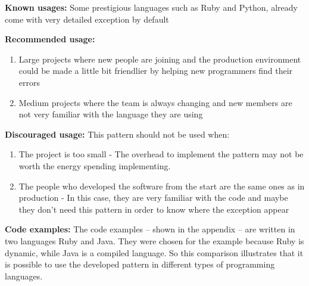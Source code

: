 \documentclass[12pt]{article}
\begin{document}
\begin{flushleft}
\textbf{Known usages:}
Some prestigious languages such as Ruby and Python, already come with very detailed exception by default\newline

\textbf{Recommended usage:}

\begin{enumerate}
\item Large projects where new people are joining and the production environment could be made a little bit friendlier by helping new programmers find their errors
\item Medium projects where the team is always changing and new members are not very familiar with the language they are using
\end{enumerate} 

\textbf{Discouraged usage:}
This pattern should not be used when:
\begin{enumerate}
\item The project is too small - The overhead to implement the pattern may not be worth the energy spending implementing.
\item The people who developed the software from the start are the same ones as in production - In this case, they are very familiar with the code and maybe they don't need this pattern in order to know where the exception appear
\end{enumerate}


\textbf{Code examples:}
The code examples -- shown in the appendix -- are written in two languages Ruby and Java. They were chosen for the example because Ruby is dynamic, while Java is a compiled language. So this comparison illustrates that it is possible to use the developed pattern in different types of programming languages.

% 







\end{flushleft}
\end{document}
